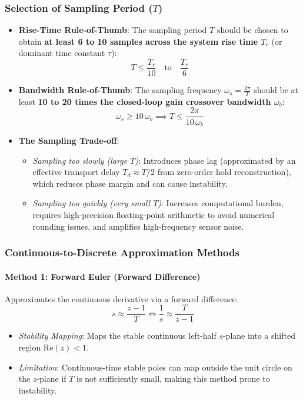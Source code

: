 \documentclass[12pt,onecolumn,twoside ]{article}
\begin{document}
	\subsubsection{Selection of Sampling Period ($T$)}
	\begin{itemize}
		\item
		\textbf{Rise-Time Rule-of-Thumb}: The sampling period $T$ should be chosen to obtain \textbf{at least 6 to 10 samples across the system rise time $T_r$} (or dominant time constant $\tau$): \[
		T \le \frac{T_r}{10} \quad \text{to} \quad \frac{T_r}{6}
		\]
		\item
		\textbf{Bandwidth Rule-of-Thumb}: The sampling frequency $\omega_s = \frac{2\pi}{T}$ should be at least \textbf{10 to 20 times the closed-loop gain crossover bandwidth $\omega_b$}: \[
		\omega_s \ge 10\,\omega_b \implies T \le \frac{2\pi}{10\,\omega_b}
		\]
		\item
		\textbf{The Sampling Trade-off}:
		\begin{itemize}
			\item
			\textit{Sampling too slowly (large $T$)}: Introduces phase lag (approximated by an effective transport delay $T_d \approx T/2$ from zero-order hold reconstruction), which reduces phase margin and can cause instability.
			\item
			\textit{Sampling too quickly (very small $T$)}: Increases computational burden, requires high-precision floating-point arithmetic to avoid numerical rounding issues, and amplifies high-frequency sensor noise.
		\end{itemize}
	\end{itemize}
	
	\subsubsection{Continuous-to-Discrete Approximation Methods}
	\paragraph{Method 1: Forward Euler (Forward Difference)}
	Approximates the continuous derivative via a forward difference: \[
	s \approx \frac{z - 1}{T} \iff \frac{1}{s} \approx \frac{T}{z - 1}
	\]
	\begin{itemize}
		\item
		\textit{Stability Mapping}: Maps the stable continuous left-half $s$-plane into a shifted region $\text{Re}(z) < 1$.
		\item
		\textit{Limitation}: Continuous-time stable poles can map outside the unit circle on the $z$-plane if $T$ is not sufficiently small, making this method prone to instability.
	\end{itemize}
\end{document}

